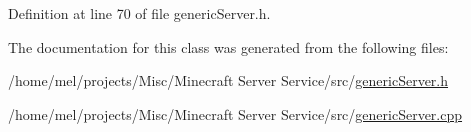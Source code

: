 Definition at line 70 of file generic\+Server.\+h.



The documentation for this class was generated from the following files\+:\begin{DoxyCompactItemize}
\item 
/home/mel/projects/\+Misc/\+Minecraft Server Service/src/\hyperlink{generic_server_8h}{generic\+Server.\+h}\item 
/home/mel/projects/\+Misc/\+Minecraft Server Service/src/\hyperlink{generic_server_8cpp}{generic\+Server.\+cpp}\end{DoxyCompactItemize}
